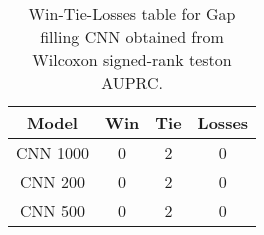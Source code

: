 \begin{table}[H]
\centering
\begin{tabular}{|c|c|c|c|}

\textbf{Model} &  \textbf{Win} &  \textbf{Tie} &  \textbf{Losses} \\
\hline

      CNN 1000 &             0 &             2 &                0 \\
\hline
       CNN 200 &             0 &             2 &                0 \\
\hline
       CNN 500 &             0 &             2 &                0 \\
\hline

\end{tabular}
\caption{Win-Tie-Losses table for Gap filling CNN obtained from Wilcoxon signed-rank teston AUPRC.}
\label{tab:gap_filling_cnn_model_comparison}
\end{table}